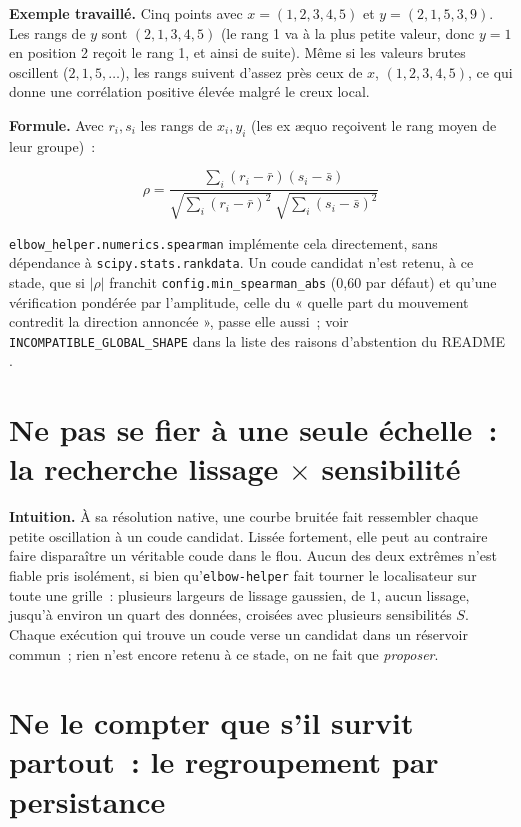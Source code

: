 \documentclass[11pt]{article}
\newcommand{\code}[1]{\texttt{#1}}
\begin{document}
\textbf{Exemple travaillé.} Cinq points avec $x = (1,2,3,4,5)$ et $y =
(2,1,5,3,9)$. Les rangs de $y$ sont $(2,1,3,4,5)$ (le rang 1 va à la plus
petite valeur, donc $y=1$ en position 2 reçoit le rang 1, et ainsi de
suite). Même si les valeurs brutes oscillent ($2, 1, 5, \dots$), les rangs
suivent d'assez près ceux de $x$, $(1,2,3,4,5)$, ce qui donne une
corrélation positive élevée malgré le creux local.

\textbf{Formule.} Avec $r_i, s_i$ les rangs de $x_i, y_i$ (les ex æquo
reçoivent le rang moyen de leur groupe)~:

\begin{equation}
\rho = \frac{\sum_i (r_i - \bar r)(s_i - \bar s)}{\sqrt{\sum_i (r_i - \bar r)^2}\ \sqrt{\sum_i (s_i - \bar s)^2}}
\end{equation}

\code{elbow\_helper.numerics.spearman} implémente cela directement, sans
dépendance à \code{scipy.stats.rankdata}. Un coude candidat n'est retenu, à
ce stade, que si $|\rho|$ franchit \code{config.min\_spearman\_abs} (0,60
par défaut) et qu'une vérification pondérée par l'amplitude, celle du
« quelle part du mouvement contredit la direction annoncée », passe elle
aussi~; voir \code{INCOMPATIBLE\_GLOBAL\_SHAPE} dans la liste des raisons
d'abstention du README \citep{spearman1904}.

\section{Ne pas se fier à une seule échelle~: la recherche lissage $\times$ sensibilité}
\label{sec:multiechelle}

\textbf{Intuition.} À sa résolution native, une courbe bruitée fait
ressembler chaque petite oscillation à un coude candidat. Lissée fortement,
elle peut au contraire faire disparaître un véritable coude dans le flou.
Aucun des deux extrêmes n'est fiable pris isolément, si bien
qu'\code{elbow-helper} fait tourner le localisateur sur toute une grille~:
plusieurs largeurs de lissage gaussien, de $1$, aucun lissage, jusqu'à
environ un quart des données, croisées avec plusieurs sensibilités $S$.
Chaque exécution qui trouve un coude verse un candidat dans un réservoir
commun~; rien n'est encore retenu à ce stade, on ne fait que
\emph{proposer}.

\section{Ne le compter que s'il survit partout~: le regroupement par persistance}
\label{sec:persistence}
\end{document}
